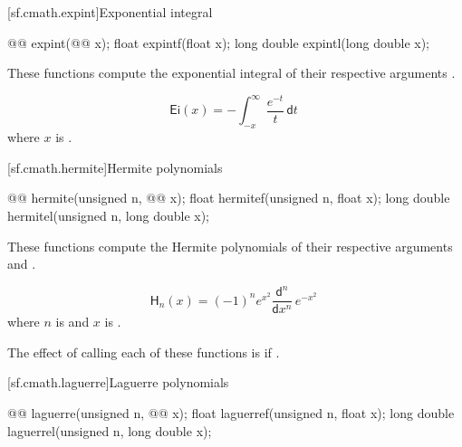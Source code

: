 [sf.cmath.expint]{Exponential integral}%
%
%
%
%
%
\begin{itemdecl}
@@ expint(@@ x);
float        expintf(float x);
long double  expintl(long double x);
\end{itemdecl}

\begin{itemdescr}

\pnum
\effects
These functions compute the exponential integral
of their respective arguments
.

\pnum
\returns
\[%
  \mathsf{Ei}(x) =
  - \int_{-x}^\infty \frac{e^{-t}}
                          {t     } \, \mathsf{d}t
\;
\]
where
$x$ is .

\end{itemdescr}

[sf.cmath.hermite]{Hermite polynomials}%
%
%
%
%
%
\begin{itemdecl}
@@ hermite(unsigned n, @@ x);
float        hermitef(unsigned n, float x);
long double  hermitel(unsigned n, long double x);
\end{itemdecl}

\begin{itemdescr}
\pnum
\effects
These functions compute the Hermite polynomials
of their respective arguments
 and .

\pnum
\returns
\[%
  \mathsf{H}_n(x) =
  (-1)^n e^{x^2} \frac{ \mathsf{d} ^n}
		      { \mathsf{d}x^n} \, e^{-x^2}
\;
\]
where
$n$ is  and
$x$ is .

\pnum
\remarks
The effect of calling each of these functions
is 
if .
\end{itemdescr}

[sf.cmath.laguerre]{Laguerre polynomials}%
%
%
%
%
%
\begin{itemdecl}
@@ laguerre(unsigned n, @@ x);
float        laguerref(unsigned n, float x);
long double  laguerrel(unsigned n, long double x);
\end{itemdecl}


